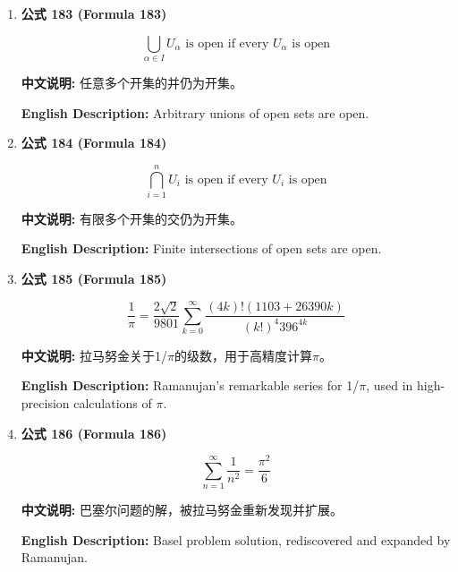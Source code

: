 \documentclass[12pt,a4paper]{article}
\begin{document}
\begin{enumerate}[leftmargin=*]
\vspace{0.5cm}

\item \textbf{公式 183 (Formula 183)}

\begin{equation}
\bigcup_{\alpha \in I} U_\alpha \text{ is open if every } U_\alpha \text{ is open}
\end{equation}

\textbf{中文说明:} 任意多个开集的并仍为开集。

\textbf{English Description:} Arbitrary unions of open sets are open.

\vspace{0.5cm}

\item \textbf{公式 184 (Formula 184)}

\begin{equation}
\bigcap_{i=1}^n U_i \text{ is open if every } U_i \text{ is open}
\end{equation}

\textbf{中文说明:} 有限多个开集的交仍为开集。

\textbf{English Description:} Finite intersections of open sets are open.

\vspace{0.5cm}

\item \textbf{公式 185 (Formula 185)}

\begin{equation}
\frac{1}{\pi} = \frac{2\sqrt{2}}{9801} \sum_{k=0}^{\infty} \frac{(4k)! (1103 + 26390k)}{(k!)^4 396^{4k}}
\end{equation}

\textbf{中文说明:} 拉马努金关于1/$\pi$的级数，用于高精度计算$\pi$。

\textbf{English Description:} Ramanujan's remarkable series for 1/$\pi$, used in high-precision calculations of $\pi$.

\vspace{0.5cm}

\item \textbf{公式 186 (Formula 186)}

\begin{equation}
\sum_{n=1}^{\infty} \frac{1}{n^2} = \frac{\pi^2}{6}
\end{equation}

\textbf{中文说明:} 巴塞尔问题的解，被拉马努金重新发现并扩展。

\textbf{English Description:} Basel problem solution, rediscovered and expanded by Ramanujan.


\end{enumerate}
\end{document}
